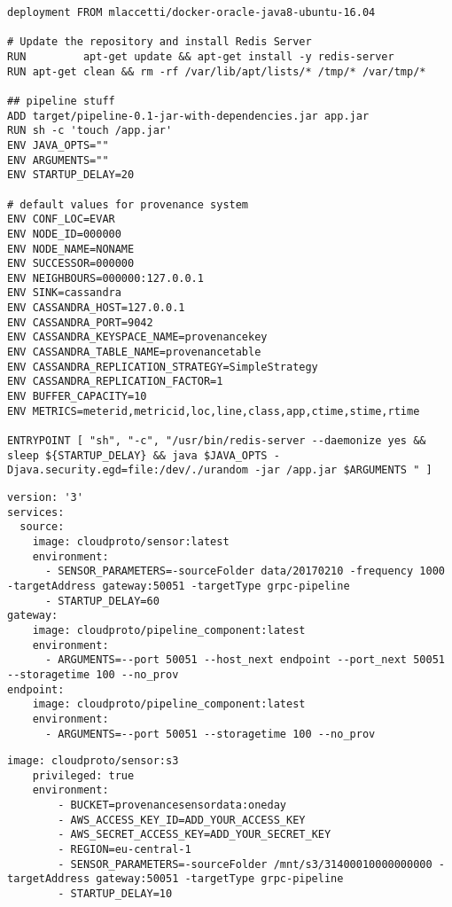 \begin{lstlisting}[label=lst:pipelinedockerfile, basicstyle=\small,caption=Dockerfile for Pipeline Component] deployment FROM mlaccetti/docker-oracle-java8-ubuntu-16.04

# Update the repository and install Redis Server
RUN         apt-get update && apt-get install -y redis-server
RUN apt-get clean && rm -rf /var/lib/apt/lists/* /tmp/* /var/tmp/*

## pipeline stuff
ADD target/pipeline-0.1-jar-with-dependencies.jar app.jar
RUN sh -c 'touch /app.jar'
ENV JAVA_OPTS=""
ENV ARGUMENTS=""
ENV STARTUP_DELAY=20

# default values for provenance system
ENV CONF_LOC=EVAR
ENV NODE_ID=000000
ENV NODE_NAME=NONAME
ENV SUCCESSOR=000000
ENV NEIGHBOURS=000000:127.0.0.1
ENV SINK=cassandra
ENV CASSANDRA_HOST=127.0.0.1
ENV CASSANDRA_PORT=9042
ENV CASSANDRA_KEYSPACE_NAME=provenancekey
ENV CASSANDRA_TABLE_NAME=provenancetable
ENV CASSANDRA_REPLICATION_STRATEGY=SimpleStrategy
ENV CASSANDRA_REPLICATION_FACTOR=1
ENV BUFFER_CAPACITY=10
ENV METRICS=meterid,metricid,loc,line,class,app,ctime,stime,rtime

ENTRYPOINT [ "sh", "-c", "/usr/bin/redis-server --daemonize yes && sleep ${STARTUP_DELAY} && java $JAVA_OPTS -Djava.security.egd=file:/dev/./urandom -jar /app.jar $ARGUMENTS " ]
\end{lstlisting}

\begin{lstlisting}[label=lst:simpletopology, basicstyle=\small,caption=Simple Topology without Provenance System]
version: '3'
services:
  source:
    image: cloudproto/sensor:latest
    environment:
      - SENSOR_PARAMETERS=-sourceFolder data/20170210 -frequency 1000 -targetAddress gateway:50051 -targetType grpc-pipeline
      - STARTUP_DELAY=60
gateway:
    image: cloudproto/pipeline_component:latest
    environment:
      - ARGUMENTS=--port 50051 --host_next endpoint --port_next 50051 --storagetime 100 --no_prov
endpoint:
    image: cloudproto/pipeline_component:latest
    environment:
      - ARGUMENTS=--port 50051 --storagetime 100 --no_prov
\end{lstlisting}

\begin{lstlisting}[label=lst:sensors3, basicstyle=\small,caption=Example for use of Sensor Image by mounting S3 Bucket]
image: cloudproto/sensor:s3
    privileged: true
    environment:
        - BUCKET=provenancesensordata:oneday
        - AWS_ACCESS_KEY_ID=ADD_YOUR_ACCESS_KEY
        - AWS_SECRET_ACCESS_KEY=ADD_YOUR_SECRET_KEY
        - REGION=eu-central-1
        - SENSOR_PARAMETERS=-sourceFolder /mnt/s3/31400010000000000 -targetAddress gateway:50051 -targetType grpc-pipeline
        - STARTUP_DELAY=10
\end{lstlisting}


